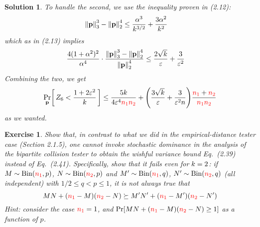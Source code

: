 \documentclass[biber]{nowfnt} %
\newtheorem{question}{Exercise}[chapter]
\newtheorem{solution}{Solution}[chapter]
\newcommand{\nss}{\textcolor{red}{\ns_1}}
\newcommand{\nst}{\textcolor{red}{\ns_2}}
\newcommand{\nss}{\ns_1}
\newcommand{\nst}{\ns_2}
\begin{document}
\begin{solution}
    To handle the second, we use the inequality proven in (2.12):
    \begin{align*}
        \norm{\p}_3^3-\normtwo{\p}^4
        &\leq \frac{\alpha^{3}}{\ab^{3/2}} + \frac{3\alpha^2}{\ab^2}
    \end{align*}
    which as in (2.13) implies
    \begin{align*}
        \frac{4(1+\alpha^2)^2}{\alpha^4}\cdot \frac{\norm{\p}_3^3-\normtwo{\p}^4}{\normtwo{\p}^4}
        &\leq \frac{2\sqrt{\ab}}{\dst}+ \frac{3}{\dst^2}\,
    \end{align*}
    Combining the two, we get
    \[
        \probaDistrOf{\p}{ Z_6 < \frac{1+2\dst^2}{\ab} } \leq \frac{5\ab}{4\dst^4\nss\nst} + \Paren{\frac{3\sqrt{\ab}}{\dst} +\frac{3}{\dst^2\ns}}\frac{\nss+\nst}{\nss\nst}
    \]
    as we wanted.

\end{solution}
\begin{question}\label{ex:nomallet}
  Show that, in contrast to what we did in the empirical-distance tester case (Section 2.1.5), one cannot invoke stochastic dominance in the analysis of the bipartite collision tester to obtain the wishful variance bound Eq.~(2.39) instead of Eq.~(2.41). Specifically, show that it fails even for $k=2$: if $M\sim\binomial{\nss}{p}$, $N\sim\binomial{\nst}{p}$ and $M'\sim\binomial{\nss}{q}$, $N'\sim\binomial{\nst}{q}$ (all independent) with $1/2\leq q < p \leq 1$, it is \emph{not} always true that
  \[
      MN+(\nss-M)(\nst-N) \succeq M'N'+(\nss-M')(\nst-N')
  \]
  \emph{Hint: consider the case $\nss=1$, and $\bPr{MN+(\nss-M)(\nst-N)\geq 1}$ as a function of $p$.}
\end{question}
\end{document}
